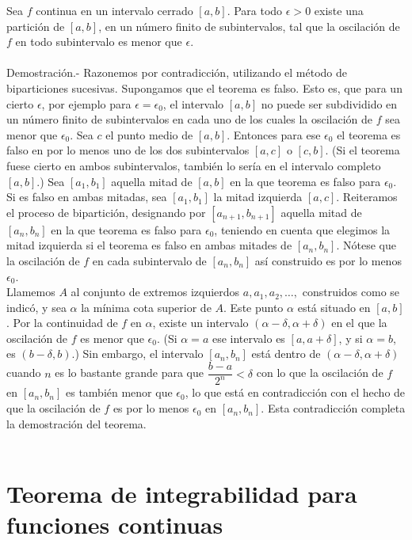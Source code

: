 \begin{teo}
    Sea $f$ continua en un intervalo cerrado $[a,b]$. Para todo $\epsilon>0$ existe una partición de $[a,b]$, en un número finito de subintervalos, tal que la oscilación de $f$ en todo subintervalo es menor que $\epsilon$.\\\\
	Demostración.-\; Razonemos por contradicción, utilizando el método de biparticiones sucesivas. Supongamos que el teorema es falso. Esto es, que para un cierto $\epsilon$, por ejemplo para $\epsilon=\epsilon_0$, el intervalo $[a,b]$ no puede ser subdividido en un número finito de subintervalos en cada uno de los cuales la oscilación de $f$ sea menor que $\epsilon_0$. Sea $c$ el punto medio de $[a,b]$. Entonces para ese $\epsilon_0$ el teorema es falso en por lo menos uno de los dos subintervalos $[a,c]$ o $[c,b]$. (Si el teorema fuese cierto en ambos subintervalos, también lo sería en el intervalo completo $[a,b]$.) Sea $[a_1,b_1]$ aquella mitad de $[a,b]$ en la que teorema es falso para $\epsilon_0$. Si es falso en ambas mitadas, sea $[a_1,b_1]$ la mitad izquierda $[a,c]$. Reiteramos el proceso de bipartición, designando por $[a_{n+1},b_{n+1}]$ aquella mitad de $[a_n,b_n]$ en la que teorema es falso para $\epsilon_0$, teniendo en cuenta que elegimos la mitad izquierda si el teorema es falso en ambas mitades de $[a_n,b_n]$. Nótese que la oscilación de $f$ en cada subintervalo de $[a_n,b_n]$ así construido es por lo menos $\epsilon_0$.\\
	Llamemos $A$ al conjunto de extremos izquierdos $a,a_1,a_2,\ldots,$ construidos como se indicó, y sea $\alpha$ la mínima cota superior de $A$. Este punto $\alpha$ está situado en $[a,b]$. Por la continuidad de $f$ en $\alpha$, existe un intervalo $(\alpha-\delta,\alpha+\delta)$ en el que la oscilación de $f$ es menor que $\epsilon_0$. (Si $\alpha=a$ ese intervalo es $[a,a+\delta]$, y si $\alpha=b$, es $(b-\delta,b)$.) Sin embargo, el intervalo $[a_n,b_n]$ está dentro de $(\alpha-\delta,\alpha+\delta)$ cuando $n$ es lo bastante grande para que $\dfrac{b-a}{2^n}<\delta$ con lo que la oscilación de $f$ en $[a_n,b_n]$ es también menor que $\epsilon_0$, lo que está en contradicción con el hecho de que la oscilación de $f$ es por lo menos $\epsilon_0$ en $[a_n,b_n]$. Esta contradicción completa la demostración del teorema.\\\\
\end{teo}

\section{Teorema de integrabilidad para funciones continuas}

